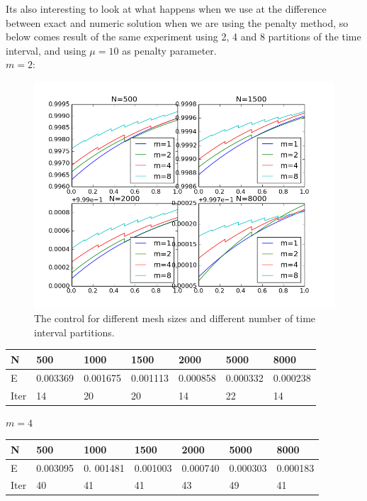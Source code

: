 \documentclass[11pt,a4paper]{report}
\begin{document}
Its also interesting to look at what happens when we use at the difference between exact and numeric solution when we are using the penalty method, so below comes result of the same experiment using 2, 4 and 8 partitions of the time interval, and using $\mu=10$ as penalty parameter.
\\
$m=2$:
\begin{figure}
  \includegraphics[width=\linewidth]{lin_manu_control.png}
  \caption{The control for different mesh sizes and different number of time interval partitions. }
  \label{Fig 3}
\end{figure}
\begin{center}
    \begin{tabular}{| l | l | l | l | l | l | l |}
    \hline
    N & 500 & 1000  & 1500 & 2000 & 5000 & 8000 \\ \hline
    E & 0.003369 & 0.001675 &0.001113 & 0.000858 & 0.000332 & 0.000238	\\ \hline
    Iter & 14 & 20  & 20 & 14 & 22 & 14 \\ \hline
    \end{tabular}
\end{center}
$m=4$
\begin{center}
    \begin{tabular}{| l | l | l | l | l | l | l |}
    \hline
    N & 500 & 1000  & 1500 & 2000 & 5000 & 8000 \\ \hline
    E & 0.003095 & 0. 001481& 0.001003 & 0.000740 & 0.000303 & 0.000183\\ \hline
    Iter & 40 & 41  & 41 & 43 & 49 & 41 \\ \hline
    \end{tabular}
\end{center}
\end{document}
